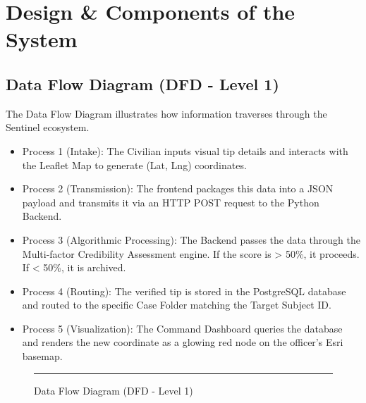\documentclass[12pt,a4paper]{report}
\begin{document}
\section{Design \& Components of the System}

\subsection{Data Flow Diagram (DFD - Level 1)}
The Data Flow Diagram illustrates how information traverses through the Sentinel ecosystem.
\begin{itemize}
    \item Process 1 (Intake): The Civilian inputs visual tip details and interacts with the Leaflet Map to generate (Lat, Lng) coordinates.
    \item Process 2 (Transmission): The frontend packages this data into a JSON payload and transmits it via an HTTP POST request to the Python Backend.
    \item Process 3 (Algorithmic Processing): The Backend passes the data through the Multi-factor Credibility Assessment engine. If the score is > 50\%, it proceeds. If < 50\%, it is archived.
    \item Process 4 (Routing): The verified tip is stored in the PostgreSQL database and routed to the specific Case Folder matching the Target Subject ID.
    \item Process 5 (Visualization): The Command Dashboard queries the database and renders the new coordinate as a glowing red node on the officer's Esri basemap.
\end{itemize}

\begin{figure}[H]
    \centering
    \rule{10cm}{6cm} %
    \caption{Data Flow Diagram (DFD - Level 1)}
\end{figure}
\end{document}
